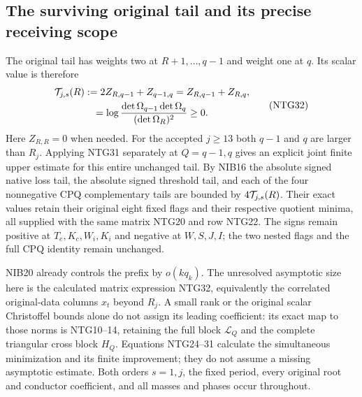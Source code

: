 \documentclass[11pt,a4paper]{article}
\begin{document}
\subsection{The surviving original tail and its precise receiving scope}
The original tail has weights two at $R+1,\ldots,q-1$
and weight one at $q$. Its scalar value is therefore
\[
\begin{gathered}
 {\cal T}_{j,s}(R)
   :=2Z_{R,q-1}+Z_{q-1,q}
    =Z_{R,q-1}+Z_{R,q},\\
 =\log\frac{\det\Omega_{q-1}\det\Omega_q}
                         {(\det\Omega_R)^2}\ge0 .
\end{gathered}                                                    \tag{NTG32}
\]
Here $Z_{R,R}=0$ when needed. For the accepted $j\ge13$
both $q-1$ and $q$ are larger than $R_j$.
Applying NTG31 separately at $Q=q-1,q$ gives an
explicit joint finite upper estimate for this entire
unchanged tail. By NIB16 the absolute signed native
loss tail, the absolute signed threshold tail, and
each of the four nonnegative CPQ complementary tails
are bounded by $4{\cal T}_{j,s}(R)$.
Their exact values retain their original eight fixed
flags and their respective quotient minima, all
supplied with the same matrix NTG20 and row NTG22.
The signs remain positive at $T_e,K_c,W_i,K_i$ and
negative at $W,S,J,I$; the two nested flags and
the full CPQ identity remain unchanged.

NIB20 already controls the prefix by $o(kq_k)$.
The unresolved asymptotic size here is the calculated
matrix expression NTG32, equivalently the correlated
original-data columns $x_t$ beyond $R_j$. A small rank
or the original scalar Christoffel bounds alone do
not assign its leading coefficient: its exact map
to those norms is NTG10--14, retaining the full block
$\mathcal L_Q$ and the complete triangular cross block $H_Q$.
Equations NTG24--31 calculate the simultaneous
minimization and its finite improvement; they do
not assume a missing asymptotic estimate. Both
orders $s=1,j$, the fixed period, every original
root and conductor coefficient, and all masses
and phases occur throughout.
\end{document}
